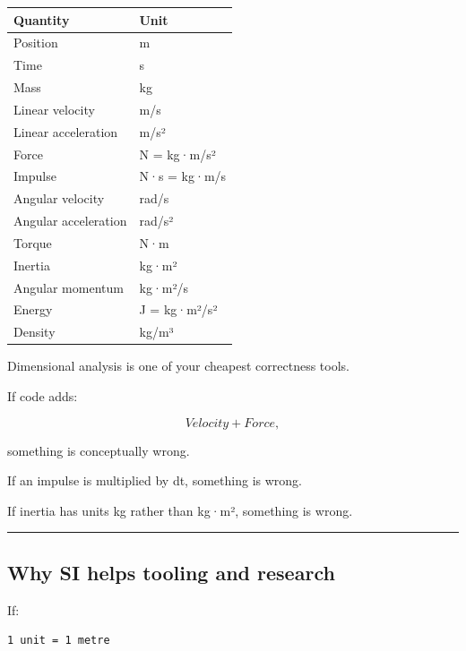 \hypertarget{06-engine-ii-ch039-full-dimensional-table}{}

{\def\LTcaptype{none} %
\begin{longtable}[]{@{}ll@{}}
\toprule\noalign{}
Quantity & Unit \\
\midrule\noalign{}
\endhead
\bottomrule\noalign{}
\endlastfoot
Position & m \\
Time & s \\
Mass & kg \\
Linear velocity & m/s \\
Linear acceleration & m/s² \\
Force & N = kg·m/s² \\
Impulse & N·s = kg·m/s \\
Angular velocity & rad/s \\
Angular acceleration & rad/s² \\
Torque & N·m \\
Inertia & kg·m² \\
Angular momentum & kg·m²/s \\
Energy & J = kg·m²/s² \\
Density & kg/m³ \\
\end{longtable}
}

Dimensional analysis is one of your cheapest correctness tools.

If code adds:

\[
Velocity+Force,
\]

something is conceptually wrong.

If an impulse is multiplied by dt, something is wrong.

If inertia has units kg rather than kg·m², something is wrong.

\begin{center}\rule{0.5\linewidth}{0.5pt}\end{center}

\subsection{Why SI helps tooling and research}\label{06-engine-ii-ch039-why-si-helps-tooling-and-research}

\hypertarget{06-engine-ii-ch039-why-si-helps-tooling-and-research}{}

If:

\begin{verbatim}
1 unit = 1 metre
\end{verbatim}

